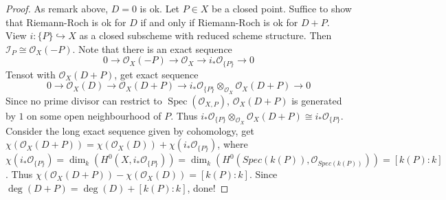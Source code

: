 \documentclass{ctexart}
\newcommand{\spec}{\operatorname{Spec}}
\begin{document}
\begin{proof}
    As remark above, $D = 0$ is ok.
    Let $P\in X$ be a closed point.
    Suffice to show that Riemann-Roch is ok for $D$ if and only if Riemann-Roch is ok for $D + P$.
    View $i: \{P\} \hookrightarrow  X$ as a closed subscheme with reduced scheme structure.
    Then $\mathcal{I}_{P} \cong \mathcal{O}_{X}(-P)$.
    Note that there is an exact sequence
    \begin{equation*}
        0 \longrightarrow \mathcal{O}_{X}(-P) \longrightarrow \mathcal{O}_{X} \longrightarrow i_{\ast}\mathcal{O}_{\{P\}} \longrightarrow 0
    \end{equation*}
    Tensot with $\mathcal{O}_{X}(D + P)$, get exact sequence
    \begin{equation*}
        0 \longrightarrow \mathcal{O}_{X}(D) \longrightarrow \mathcal{O}_{X}(D + P) \longrightarrow i_{\ast}\mathcal{O}_{\{P\}} \otimes_{\mathcal{O}_{X}} \mathcal{O}_{X}(D + P) \longrightarrow 0
    \end{equation*}
    Since no prime divisor can restrict to $\spec(\mathcal{O}_{X, P})$, $\mathcal{O}_{X}(D + P)$ is generated by $1$ on some open neighbourhood of $P$.
    Thus $i_{\ast}\mathcal{O}_{\{P\}} \otimes_{\mathcal{O}_{X}} \mathcal{O}_{X}(D + P) \cong i_{\ast}\mathcal{O}_{\{P\}}$.
    Consider the long exact sequence given by cohomology, get $\chi(\mathcal{O}_{X}(D + P)) = \chi(\mathcal{O}_{X}(D)) + \chi(i_{\ast}\mathcal{O}_{\{P\}})$,
    where $\chi(i_{\ast}\mathcal{O}_{\{P\}}) = \dim_{k}(H^{0}(X, i_{\ast}\mathcal{O}_{\{P\}})) = \dim_{k}(H^{0}(Spec(k(P)), \mathcal{O}_{Spec(k(P))})) = [k(P) : k]$.
    Thus $\chi(\mathcal{O}_{X}(D + P)) - \chi(\mathcal{O}_{X}(D)) = [k(P) : k]$.
    Since $\deg(D + P) = \deg(D) + [k(P) : k]$, done!
\end{proof}
\end{document}

